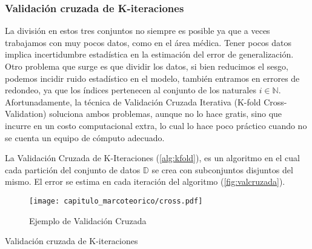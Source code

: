

\subsubsection{Validación cruzada de K-iteraciones}

La división en estos tres conjuntos no siempre es posible ya que a veces
trabajamos con muy pocos datos, como en el área médica. Tener pocos datos
implica incertidumbre estadística en la estimación del error de generalización.
Otro problema que surge es que dividir los datos, si bien reducimos el sesgo,
podemos incidir ruido estadístico en el modelo, también entramos en errores de
redondeo, ya que los índices pertenecen al conjunto de los naturales \(i \in
\mathbb{N}\). Afortunadamente, la técnica de Validación Cruzada Iterativa
(K-fold Cross-Validation) soluciona ambos problemas, aunque no lo hace gratis,
sino que incurre en un costo computacional extra, lo cual lo hace poco práctico
cuando no se cuenta un equipo de cómputo adecuado.~\cite{Hastie2009}

La Validación Cruzada de K-Iteraciones (\autoref{alg:kfold}), es un algoritmo en
el cual cada partición del conjunto de datos \(\mathbb{D}\) se crea con
subconjuntos disjuntos del mismo. El error se estima en cada iteración del
algoritmo (\autoref{fig:valcruzada}).~\cite{Goodfellow2016}

\begin{figure}[H]
    \centering
    \texttt{[image: capitulo\_marcoteorico/cross.pdf]}
    \caption{Ejemplo de Validación Cruzada}\label{fig:valcruzada}
\end{figure}

\begin{algorithm}[H]
    \SetAlgoLined{}
    \BlankLine{}
    \BlankLine{}
    \BlankLine{}
    \BlankLine{}
    \BlankLine{}
    \BlankLine{}
    \caption{Validación cruzada de K-iteraciones}\label{alg:kfold}
\end{algorithm}


